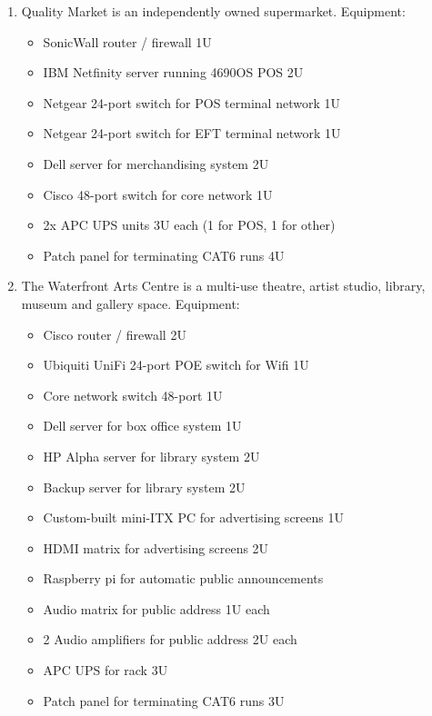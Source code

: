 \documentclass{pgnotes}
\begin{document}
\begin{enumerate}
\item
  Quality Market is an independently owned supermarket.
  Equipment:
  \begin{itemize}
    \tightlist
  \item SonicWall router / firewall 1U
  \item IBM Netfinity server running 4690OS POS 2U
  \item Netgear 24-port switch for POS terminal network 1U
  \item Netgear 24-port switch for EFT terminal network 1U
  \item Dell server for merchandising system 2U
  \item Cisco 48-port switch for core network 1U
  \item 2x APC UPS units 3U each (1 for POS, 1 for other)
  \item Patch panel for terminating CAT6 runs 4U
  \end{itemize}
  
\item
  The Waterfront Arts Centre is a multi-use theatre, artist studio, library, museum and gallery space.
  Equipment:
  \begin{itemize}
    \tightlist
  \item Cisco router / firewall 2U
  \item Ubiquiti UniFi 24-port POE switch for Wifi 1U
  \item Core network switch 48-port 1U
  \item Dell server for box office system 1U
  \item HP Alpha server for library system 2U
  \item Backup server for library system 2U
  \item Custom-built mini-ITX PC for advertising screens 1U
  \item HDMI matrix for advertising screens 2U
  \item Raspberry pi for automatic public announcements
  \item Audio matrix for public address 1U each
  \item 2 Audio amplifiers for public address 2U each
  \item APC UPS for rack 3U
  \item Patch panel for terminating CAT6 runs 3U
  \end{itemize}
  
  
\end{enumerate}
\end{document}
